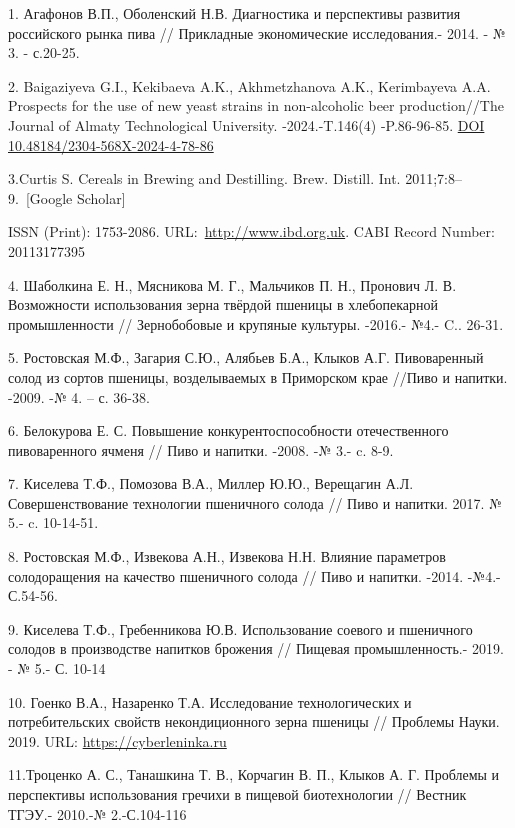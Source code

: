 \begin{references}
1. Агафонов В.П., Оболенский Н.В. Диагностика и перспективы развития
российского рынка пива // Прикладные экономические исследования.- 2014.
- № 3. - с.20-25.

2. Baigaziyeva G.I., Kekibaeva A.K., Akhmetzhanova A.K., Kerimbayeva
A.A. Prospects for the use of new yeast strains in non-alcoholic beer
production//The Journal of Almaty Technological University.
-2024.-T.146(4) -P.86-96-85.
\href{https://doi.org/10.48184/2304-568X-2024-4-78-86}{DOI
10.48184/2304-568X-2024-4-78-86}

3.Curtis S. Cereals in Brewing and Destilling. Brew. Distill. Int.
2011;7:8--9.~{[}Google Scholar{]}

ISSN (Print): 1753-2086.
URL:~\href{http://www.ibd.org.uk/}{http://www.ibd.org.uk}. CABI Record
Number: 20113177395

4. Шаболкина Е. Н., Мясникова М. Г., Мальчиков П. Н., Пронович Л. В.
Возможности использования зерна твёрдой пшеницы в хлебопекарной
промышленности // Зернобобовые и крупяные культуры. -2016.- №4.- C..
26-31.

5. Ростовская М.Ф., Загария С.Ю., Алябьев Б.А., Клыков А.Г. Пивоваренный
солод из сортов пшеницы, возделываемых в Приморском крае //Пиво и
напитки. -2009. -№ 4. -- с. 36-38.

6. Белокурова Е. С. Повышение конкурентоспособности отечественного
пивоваренного ячменя // Пиво и напитки. -2008. -№ 3.- c. 8-9.

7. Киселева Т.Ф., Помозова В.А., Миллер Ю.Ю., Верещагин А.Л.
Совершенствование технологии пшеничного солода // Пиво и напитки. 2017.
№ 5.- c. 10-14-51.

8. Ростовская М.Ф., Извекова А.Н., Извекова Н.Н. Влияние параметров
солодоращения на качество пшеничного солода // Пиво и напитки. -2014.
-№4.- С.54-56.

9. Киселева Т.Ф., Гребенникова Ю.В. Использование соевого и пшеничного
солодов в производстве напитков брожения // Пищевая промышленность.-
2019. - № 5.- С. 10-14

10. Гоенко В.А., Назаренко Т.А. Исследование технологических и
потребительских свойств некондиционного зерна пшеницы // Проблемы Науки.
2019. URL: \href{https://cyberleninka.ru/article/n/issledovanie-tehnologicheskih-i-potrebitelskih-svoystv-nekonditsionnogo-zerna-pshenitsy}{https://cyberleninka.ru}

11.Троценко А. С., Танашкина Т. В., Корчагин В. П., Клыков А. Г.
Проблемы и перспективы использования гречихи в пищевой биотехнологии //
Вестник ТГЭУ.- 2010.-№ 2.-С.104-116


\end{references}

